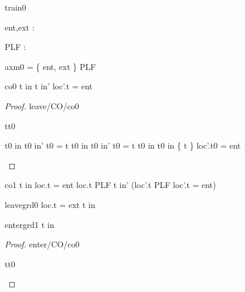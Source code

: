 \documentclass[12pt]{amsart}
\begin{document}
\begin{machine}{train0}
\begin{constant}
	ent,ext : \BLK
\end{constant}
\begin{constant}
	PLF : \set [\BLK]
\end{constant}

\begin{assumption}{axm0}
	\BLK = \{ ent, ext \} \bunion PLF
\end{assumption}

%
\begin{constraint}{co0}
	\neg t \in in \land t \in in' \implies  loc'.t = ent %
\end{constraint}
%
\begin{proof}{leave/CO/co0}
	\begin{free:var}{t}{t0}
	\begin{calculation}
		\neg t0 \in in \land t0 \in in'
	\hint{=}{ \ref{grd0} }
		\neg t0 = t \land \neg t0 \in in \land t0 \in in' 
	\hint{=}{ \ref{a0} }
		\neg t0 = t \land \neg t0 \in in \land t0 \in in \bunion \{ t \} 
		\false
		loc'.t0 = ent
	\end{calculation}
	\end{free:var}
\end{proof}
%
\begin{constraint}{co1}
	 t \in in \land loc.t = ent  \land \neg loc.t \in PLF 
\implies t \in in' \land (loc'.t \in PLF \lor loc'.t = ent)
\end{constraint}


%

\begin{evguard}{leave}{grd0}
	loc.t = ext \land t \in in
\end{evguard}

\begin{evguard}{enter}{grd1}
	\neg t \in in
\end{evguard}

\begin{proof}{enter/CO/co0}
	\begin{free:var}{t}{t0}


\end{free:var}
\end{proof}
\end{machine}
\end{document}
